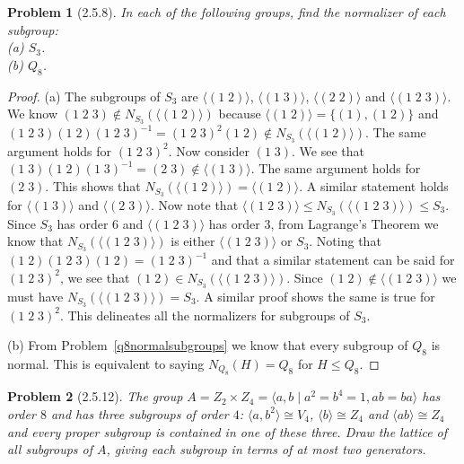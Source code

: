 \documentclass{article}
\newtheorem{problem}{Problem}
\begin{document}
\begin{problem}[2.5.8]
In each of the following groups, find the normalizer of each subgroup:\\
(a) $S_3$.\\
(b) $Q_8$.
\end{problem}
\begin{proof}
(a) The subgroups of $S_3$ are $\langle (1 \; 2) \rangle$, $\langle (1 \; 3) \rangle$, $\langle (2 \; 2) \rangle$ and $\langle (1 \; 2 \; 3) \rangle$. We know $(1 \; 2 \; 3) \notin N_{S_3}(\langle (1 \; 2) \rangle)$ because $\langle (1 \; 2) \rangle = \{(1), (1 \; 2)\}$ and $(1 \; 2 \; 3)(1 \; 2)(1 \; 2 \; 3)^{-1} = (1 \; 2\; 3)^2(1 \; 2) \notin N_{S_3}(\langle (1 \; 2) \rangle)$. The same argument holds for $(1 \; 2 \; 3)^2$. Now consider $(1 \; 3)$. We see that $(1 \; 3)(1 \; 2)(1 \; 3)^{-1} = (2 \; 3) \notin \langle (1 \; 3) \rangle$. The same argument holds for $(2 \; 3)$. This shows that $N_{S_3}(\langle (1 \; 2) \rangle ) = \langle (1 \; 2) \rangle$. A similar statement holds for $\langle (1 \; 3) \rangle$ and $\langle (2 \; 3) \rangle$. Now note that $\langle (1 \; 2 \; 3) \rangle \leq N_{S_3}(\langle (1 \; 2 \; 3) \rangle) \leq S_3$. Since $S_3$ has order $6$ and $\langle (1 \; 2 \; 3) \rangle$ has order $3$, from Lagrange's Theorem we know that $N_{S_3}(\langle (1 \; 2 \; 3) \rangle)$ is either $\langle (1 \; 2 \; 3) \rangle$ or $S_3$. Noting that $(1 \; 2)(1 \; 2 \; 3)(1 \; 2) = (1 \; 2 \; 3)^{-1}$ and that a similar statement can be said for $(1 \; 2 \; 3)^2$, we see that $(1 \; 2) \in N_{S_3}(\langle (1 \; 2 \; 3) \rangle)$. Since $(1 \; 2) \notin \langle (1 \; 2 \; 3) \rangle$ we must have $N_{S_3}(\langle (1 \; 2 \; 3) \rangle ) = S_3$. A similar proof shows the same is true for $(1 \; 2 \; 3)^2$. This delineates all the normalizers for subgroups of $S_3$.

(b) From Problem~\ref{q8normalsubgroups} we know that every subgroup of $Q_8$ is normal. This is equivalent to saying $N_{Q_8}(H) = Q_8$ for $H \leq Q_8$.
\end{proof}

\begin{problem}[2.5.12]
The group $A = Z_2 \times Z_4 = \langle a,b \mid a^2 = b^4 = 1, ab = ba \rangle$ has order $8$ and has three subgroups of order $4$: $\langle a, b^2 \rangle \cong V_4$, $\langle b \rangle \cong Z_4$ and $\langle ab \rangle \cong Z_4$ and every proper subgroup is contained in one of these three. Draw the lattice of all subgroups of $A$, giving each subgroup in terms of at most two generators.
\end{problem}
\end{document}
